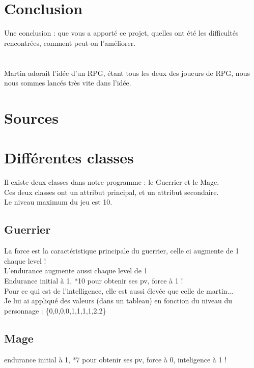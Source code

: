 \documentclass[a4paper,titlepage]{article}
\begin{document}
	\section{Conclusion}
	Une conclusion : que vous a apporté ce projet, quelles ont été les difficultés rencontrées, comment peut-on l’améliorer.\\
	\\
	\\
	Martin adorait l'idée d'un RPG, étant tous les deux des joueurs de RPG, nous nous sommes lancés très vite dans l'idée.
	
	
	
	\clearpage
	\section*{Sources }
		
	
	
	\section*{Différentes classes}
		Il existe deux classes dans notre programme : le Guerrier et le Mage.\\
		Ces deux classes ont un attribut principal, et un attribut secondaire.\\
		Le niveau maximum du jeu est 10.
		
	\subsection*{Guerrier}
		La force est la caractéristique principale du guerrier, celle ci augmente de 1 chaque level !\\
		L'endurance augmente aussi chaque level de 1\\
		Endurance initial à 1, *10 pour obtenir ses pv, force à 1 !\\
		Pour ce qui est de l'intelligence, elle est aussi élevée que celle de martin...\\ Je lui ai appliqué des valeurs (dans un tableau) en fonction du niveau du personnage : 	\{0,0,0,0,1,1,1,1,2,2\}
		
	\subsection*{Mage}
		endurance initial à 1, *7 pour obtenir ses pv, force à 0, inteligence à 1 !
	
\end{document}
